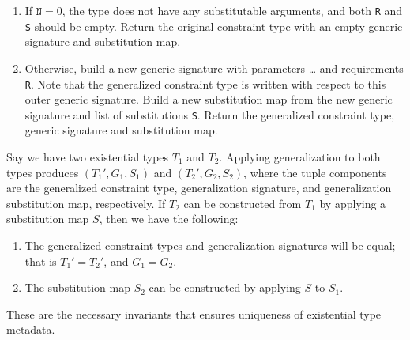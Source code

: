\documentclass[../generics]{subfiles}
\begin{document}
\begin{algorithm}
\begin{enumerate}
\item If $\texttt{N}=0$, the type does not have any substitutable arguments, and both \texttt{R} and \texttt{S} should be empty. Return the original constraint type with an empty generic signature and substitution map.
\item Otherwise, build a new generic signature with parameters \texttt{}\ldots{} and requirements \texttt{R}. Note that the generalized constraint type is written with respect to this outer generic signature. Build a new substitution map from the new generic signature and list of substitutions \texttt{S}. Return the generalized constraint type, generic signature and substitution map.
\end{enumerate}
\end{algorithm}

Say we have two existential types $T_1$ and $T_2$. Applying generalization to both types produces $(T_1', G_1, S_1)$ and $(T_2', G_2, S_2)$, where the tuple components are the generalized constraint type, generalization signature, and generalization substitution map, respectively. If $T_2$ can be constructed from $T_1$ by applying a substitution map $S$, then we have the following:
\begin{enumerate}
\item The generalized constraint types and generalization signatures will be equal; that is $T_1'=T_2'$, and $G_1=G_2$.
\item The substitution map $S_2$ can be constructed by applying $S$ to $S_1$.
\end{enumerate}
These are the necessary invariants that ensures uniqueness of existential type metadata.
\end{document}
